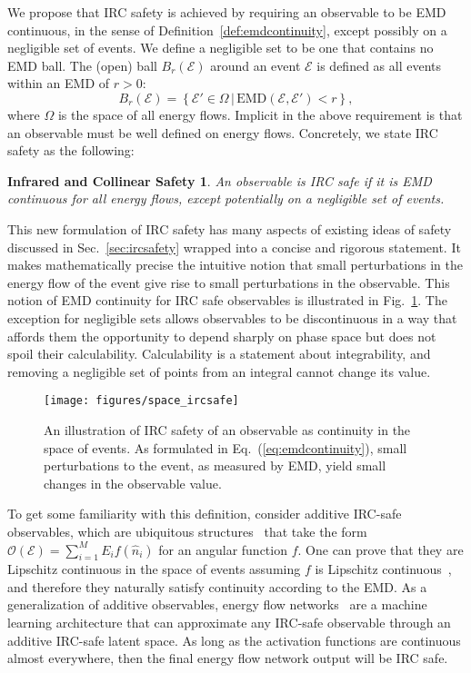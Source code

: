 \documentclass[letterpaper,11pt]{article}
\newcommand{\E}{\mathcal{E}}
\DeclareRobustCommand{\Sec}[1]{Sec.~\ref{#1}}
\DeclareRobustCommand{\Fig}[1]{Fig.~\ref{#1}}
\DeclareRobustCommand{\Eq}[1]{Eq.~(\ref{#1})}
\newtheorem*{ircsafety}{Infrared and Collinear Safety}
\newcommand{\EMD}{\text{EMD}\xspace}
\begin{document}
We propose that IRC safety is achieved by requiring an observable to be EMD continuous, in the sense of Definition~\ref{def:emdcontinuity}, except possibly on a negligible set of events.
%
We define a negligible set to be one that contains no EMD ball.
%
The (open) \EMD ball $B_r(\E)$ around an event $\mathcal E$ is defined as all events within an EMD of $r>0$:
%
\begin{equation}
B_r(\E)=\left\{\E'\in\Omega\,\Big|\,\EMD(\E,\E')<r\right\},
\end{equation}
%
where $\Omega$ is the space of all energy flows.
%
Implicit in the above requirement is that an observable must be well defined on energy flows.
%
Concretely, we state IRC safety as the following:
\begin{framed}
\begin{ircsafety}
An observable is IRC safe if it is EMD continuous for all energy flows, except potentially on a negligible set of events.
\end{ircsafety}
\end{framed}
%
\noindent This new formulation of IRC safety has many aspects of existing ideas of safety discussed in \Sec{sec:ircsafety} wrapped into a concise and rigorous statement.
%
It makes mathematically precise the intuitive notion that small perturbations in the energy flow of the event give rise to small perturbations in the observable.
%
This notion of EMD continuity for IRC safe observables is illustrated in \Fig{fig:space_ircsafe}.
%
The exception for negligible sets allows observables to be discontinuous in a way that affords them the opportunity to depend sharply on phase space but does not spoil their calculability.
%
Calculability is a statement about integrability, and removing a negligible set of points from an integral cannot change its value.


\begin{figure}[t]
\centering
\texttt{[image: figures/space\_ircsafe]}
\caption{\label{fig:space_ircsafe} An illustration of IRC safety of an observable as continuity in the space of events.
%
As formulated in \Eq{eq:emdcontinuity}, small perturbations to the event, as measured by EMD, yield small changes in the observable value.}
\end{figure}


To get some familiarity with this definition, consider additive IRC-safe observables, which are ubiquitous structures~\cite{Komiske:2019asc} that take the form $\mathcal O(\mathcal E) = \sum_{i=1}^M E_i f(\hat n_i)$ for an angular function $f$.
%
One can prove that they are Lipschitz continuous in the space of events assuming $f$ is Lipschitz continuous~\cite{Komiske:2019fks}, and therefore they naturally satisfy continuity according to the EMD.
%
As a generalization of additive observables, energy flow networks~\cite{Komiske:2018cqr} are a machine learning architecture that can approximate any IRC-safe observable through an additive IRC-safe latent space.
%
As long as the activation functions are continuous almost everywhere, then the final energy flow network output will be IRC safe.
\end{document}
